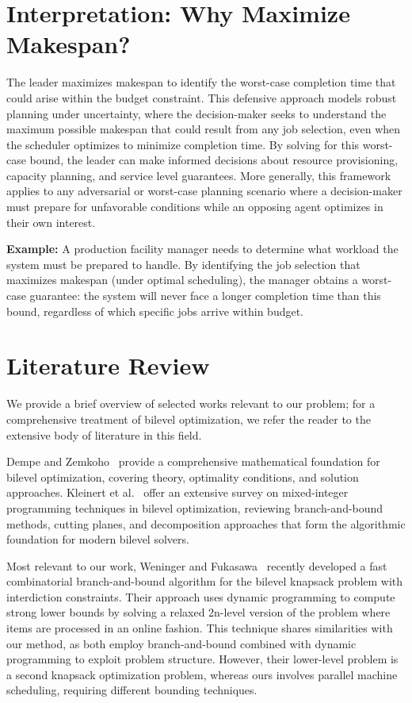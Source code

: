 \section{Interpretation: Why Maximize Makespan?}

The leader maximizes makespan to identify the worst-case completion time that could arise within the budget constraint. This defensive approach models robust planning under uncertainty, where the decision-maker seeks to understand the maximum possible makespan that could result from any job selection, even when the scheduler optimizes to minimize completion time. By solving for this worst-case bound, the leader can make informed decisions about resource provisioning, capacity planning, and service level guarantees. More generally, this framework applies to any adversarial or worst-case planning scenario where a decision-maker must prepare for unfavorable conditions while an opposing agent optimizes in their own interest.

\textbf{Example:} A production facility manager needs to determine what workload the system must be prepared to handle. By identifying the job selection that maximizes makespan (under optimal scheduling), the manager obtains a worst-case guarantee: the system will never face a longer completion time than this bound, regardless of which specific jobs arrive within budget.

\section{Literature Review}

We provide a brief overview of selected works relevant to our problem; for a comprehensive treatment of bilevel optimization, we refer the reader to the extensive body of literature in this field. 

Dempe and Zemkoho~\cite{dempe2020bilevel} provide a comprehensive mathematical foundation for bilevel optimization, covering theory, optimality conditions, and solution approaches. Kleinert et al.~\cite{kleinert2021survey} offer an extensive survey on mixed-integer programming techniques in bilevel optimization, reviewing branch-and-bound methods, cutting planes, and decomposition approaches that form the algorithmic foundation for modern bilevel solvers.


Most relevant to our work, Weninger and Fukasawa~\cite{weninger2025bilevel} recently developed a fast combinatorial branch-and-bound algorithm for the bilevel knapsack problem with interdiction constraints. 
Their approach uses dynamic programming to compute strong lower bounds by solving a relaxed 2n-level version of the problem where items are processed in an online fashion. 
This technique shares similarities with our method, as both employ branch-and-bound combined with dynamic programming to exploit problem structure. 
However, their lower-level problem is a second knapsack optimization problem, whereas ours involves parallel machine scheduling, requiring different bounding techniques.

